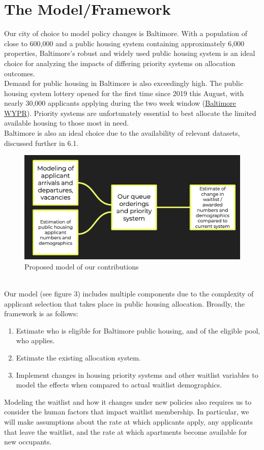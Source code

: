 \documentclass[11pt]{article}
\begin{document}
\section{The Model/Framework}
\noindent
Our city of choice to model policy changes is Baltimore. With a population of close to 600,000 and a public housing system containing approximately 6,000 properties, Baltimore's robust and widely used public housing system is an ideal choice for analyzing the impacts of differing priority systems on allocation outcomes. \\
\newline
Demand for public housing in Baltimore is also exceedingly high. The public housing system lottery opened for the first time since 2019 this August, with nearly 30,000 applicants applying during the two week window (\href{https://www.wypr.org/wypr-news/2023-08-14/28-000-apply-for-baltimore-city-housing-wait-list-two-week-window-ends-tonight}{Baltimore WYPR}). Priority systems are unfortunately essential to best allocate the limited available housing to those most in need. \\
\newline
Baltimore is also an ideal choice due to the availability of relevant datasets, discussed further in 6.1. \\
\begin{figure}
    \centering
    \includegraphics[width=0.75\linewidth]{ourmodel.png}
    \caption{Proposed model of our contributions}
    \label{fig:enter-label}
\end{figure}
\\Our model (see figure 3) includes multiple components due to the complexity of applicant selection that takes place in public housing allocation. Broadly, the framework is as follows:
\begin{enumerate}
    \item Estimate who is eligible for Baltimore public housing, and of the eligible pool, who applies.
    \item Estimate the existing allocation system.
    \item Implement changes in housing priority systems and other waitlist variables to model the effects when compared to actual waitlist demographics. 
\end{enumerate}
Modeling the waitlist and how it changes under new policies also requires us to consider the human factors that impact waitlist membership. In particular, we will make assumptions about the rate at which applicants apply, any applicants that leave the waitlist, and the rate at which apartments become available for new occupants.
\end{document}
